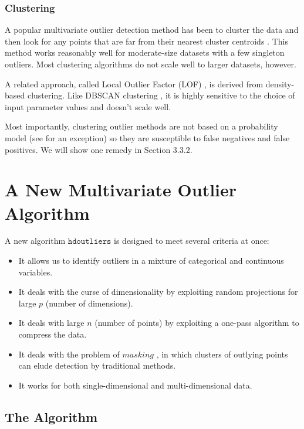 \documentclass[12pt]{article}
\begin{document}
\subsubsection{Clustering} 
A popular multivariate outlier detection method has been to cluster the data and then look for any points that are far from their nearest cluster centroids \citep{ZahnClustering, JiangOutlierClustering,OutlierClustering,Jobe}. This method works reasonably well for moderate-size datasets with a few singleton outliers. Most clustering algorithms do not scale well to larger datasets, however. 

A related approach, called Local Outlier Factor (LOF) \citep{BreunigLOF}, is derived from density-based clustering. Like DBSCAN clustering \citep{DBSCAN},  it is highly sensitive to the choice of input parameter values and doesn't scale well.

Most importantly, clustering outlier methods are not based on a probability model (see \cite{FraleyRaftery} for an exception) so they are susceptible to false negatives and false positives. We will show one remedy in Section 3.3.2.

\section{A New Multivariate Outlier Algorithm}
A new algorithm $\mathtt{hdoutliers}$ is designed to meet several criteria at once:
\begin{itemize}
\item It allows us to identify outliers in a mixture of categorical and continuous variables.
\item It deals with the curse of dimensionality by exploiting random projections for large $p$ (number of dimensions).
\item It deals with large $n$ (number of points) by exploiting a one-pass algorithm to compress the data.
\item It deals with the problem of $masking$ \cite{BarnettLewis}, in which clusters of outlying points can elude detection by traditional methods.
\item It works for both single-dimensional and multi-dimensional data.

\end{itemize}
\subsection{The Algorithm}
\end{document}
